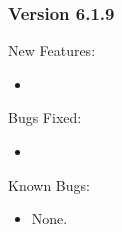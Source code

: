 \subsubsection{\label{sec:New-6-1-9}Version 6.1.9}

\noindent New Features:

\begin{itemize}

\item

\end{itemize}

\noindent Bugs Fixed:

\begin{itemize}

\item 

\end{itemize}

\noindent Known Bugs:

\begin{itemize}

\item None.

\end{itemize}


